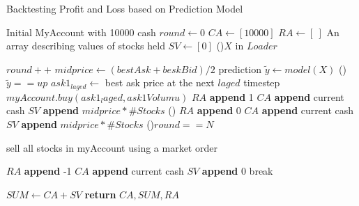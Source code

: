 \documentclass{\SetClass}
\begin{document}
\begin{algorithm}
\caption{Backtesting Profit and Loss based on Prediction Model}\label{algorithm}
Initial MyAccount with 10000 cash\;
$round\leftarrow 0$ \;
$CA\leftarrow [10000]$ \;
$RA\leftarrow [\ ]$\;
An array describing values of stocks held $SV\leftarrow [0]$\;
\ForEach(){$X$ in $Loader$}{
    $round++$\;
    $midprice\leftarrow (bestAsk+beskBid)/2$\;
    prediction $\widetilde{y}\leftarrow model(X)$\;
    \uIf(){$\widetilde{y} == up$}{
        $ask1_{laged} \leftarrow$ best ask price at the next $laged$ timestep\;
        $myAccount.buy(ask1_laged,ask1Volumu)$\;
        $RA$ \textbf{append} 1\;
        $CA$ \textbf{append} current cash\;
        $SV$ \textbf{append} $midprice*\#Stocks$\;
    }
    \uElse(){
        $RA$ \textbf{append} 0\;
        $CA$ \textbf{append} current cash\;
        $SV$ \textbf{append} $midprice*\#Stocks$\;
    }
    \uIf(){$round==N$}{
        sell all stocks in myAccount using a market order\;

        $RA$ \textbf{append} -1\;
        $CA$ \textbf{append} current cash\;
        $SV$ \textbf{append} 0\;
        break\;
    }
}
$SUM \leftarrow CA+SV$\;
\textbf{return} $CA,SUM,RA$\;
\end{algorithm}
\end{document}

